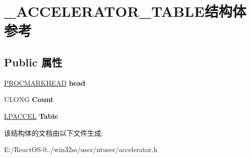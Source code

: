 \hypertarget{struct___a_c_c_e_l_e_r_a_t_o_r___t_a_b_l_e}{}\section{\+\_\+\+A\+C\+C\+E\+L\+E\+R\+A\+T\+O\+R\+\_\+\+T\+A\+B\+L\+E结构体 参考}
\label{struct___a_c_c_e_l_e_r_a_t_o_r___t_a_b_l_e}
\subsection*{Public 属性}
\begin{DoxyCompactItemize}
\item 
\mbox{\label{struct___a_c_c_e_l_e_r_a_t_o_r___t_a_b_l_e_aaeee4f090f1271bf2147390c89d32a83}} 
\hyperlink{struct___p_r_o_c_m_a_r_k_h_e_a_d}{P\+R\+O\+C\+M\+A\+R\+K\+H\+E\+AD} {\bfseries head}
\item 
\mbox{\label{struct___a_c_c_e_l_e_r_a_t_o_r___t_a_b_l_e_a2bb9c5ebe1e991080fd38c235746b2bb}} 
U\+L\+O\+NG {\bfseries Count}
\item 
\mbox{\label{struct___a_c_c_e_l_e_r_a_t_o_r___t_a_b_l_e_af5eb95022167f218119c5732417dd70e}} 
\hyperlink{structtag_a_c_c_e_l}{L\+P\+A\+C\+C\+EL} {\bfseries Table}
\end{DoxyCompactItemize}


该结构体的文档由以下文件生成\+:\begin{DoxyCompactItemize}
\item 
E\+:/\+React\+O\+S-\/0../win32ss/user/ntuser/accelerator.\+h\end{DoxyCompactItemize}
